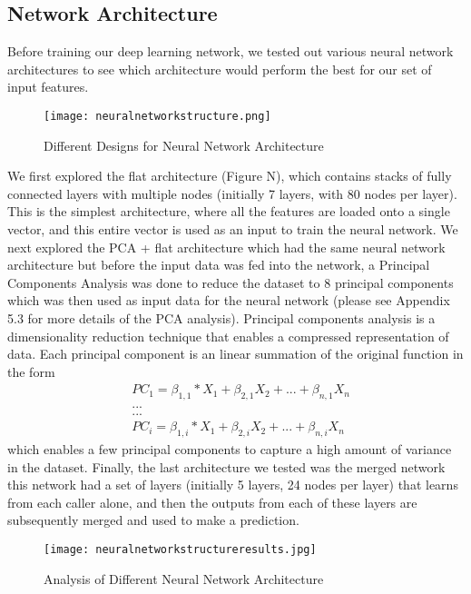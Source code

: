 \documentclass{article}
\begin{document}
\subsection{Network Architecture}
Before training our deep learning network, we tested out various neural network architectures to see which architecture would perform the best for our set of input features.  
\begin{figure}[H]
\texttt{[image: neuralnetworkstructure.png]}
\centering
\caption{Different Designs for Neural Network Architecture}
\end{figure}
We first explored the flat architecture (Figure N), which contains stacks of fully connected layers with multiple nodes (initially 7 layers, with 80 nodes per layer). This is the simplest architecture, where all the features are loaded onto a single vector, and this entire vector is used as an input to train the neural network. We next explored the PCA + flat architecture which had the same neural network architecture but before the input data was fed into the network, a Principal Components Analysis was done to reduce the dataset to 8 principal components which was then used as input data for the neural network (please see Appendix 5.3 for more details of the PCA analysis). Principal components analysis is a dimensionality reduction technique that enables a compressed representation of data. Each principal component is an linear summation of the original function in the form 
\begin{align*}
&PC_1 = \beta_{1,1}*X_{1} + \beta_{2,1} X_{2} +... + \beta_{n,1} X_n \\
&... \\
&... \\
&PC_i = \beta_{1,i}*X_{1} + \beta_{2,i} X_{2} +... + \beta_{n,i} X_n
\end{align*}
which enables a few principal components to capture a high amount of variance in the dataset.
Finally, the last architecture we tested was the merged network this network had a set of layers (initially 5 layers, 24 nodes per layer) that learns from each caller alone, and then the outputs from each of these layers are subsequently merged and used to make a prediction. 
\begin{figure}[H]
\texttt{[image: neuralnetworkstructureresults.jpg]}
\centering
\caption{Analysis of Different Neural Network Architecture}
\end{figure}
\end{document}
